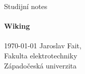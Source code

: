   \author{Jaroslav Fait}
   
  

  \begin{titlepage}
  \frontmatter %
    \vspace*{3cm} 
    \centering
    \textsf{\large Studijní notes}\\[1cm]
    \HRule \\[0.4cm] 
    \textbf{\Huge Wiking}\\[0.1cm]
    \HRule \\[1.4cm]
    \today
    \vfill 
    Jaroslav Fait,   \\
    Fakulta elektrotechniky                        \\
    Západočeská univerzita
    \vspace*{1cm}
  \end{titlepage}